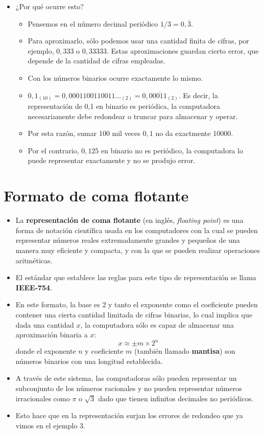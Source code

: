 \documentclass[openany]{book}
\providecommand{\tightlist}{%
  \setlength{\itemsep}{0pt}\setlength{\parskip}{0pt}}
\begin{document}
\begin{itemize}
\item
  ¿Por qué ocurre esto?

  \begin{itemize}
  \tightlist
  \item
    Pensemos en el número decimal periódico \(1/3 = 0,\overline3\).
  \item
    Para aproximarlo, sólo podemos usar una cantidad finita de cifras, por ejemplo, \(0,333\) o \(0,33333\). Estas aproximaciones guardan cierto error, que depende de la cantidad de cifras empleadas.
  \item
    Con los números binarios ocurre exactamente lo mismo.
  \item
    \(0,1_{(10)} = 0,0001100110011..._{(2)} = 0,0\overline{0011}_{(2)}\). Es decir, la representación de 0,1 en binario es periódica, la computadora necesariamente debe redondear o truncar para almacenar y operar.
  \item
    Por esta razón, sumar 100 mil veces \(0,1\) no da exactmente 10000.
  \item
    Por el contrario, \(0,125\) en binario no es periódico, la computadora lo puede representar exactamente y no se produjo error.
  \end{itemize}
\end{itemize}

\hypertarget{formato-de-coma-flotante}{%
\section{Formato de coma flotante}\label{formato-de-coma-flotante}}

\begin{itemize}
\item
  La \textbf{representación de coma flotante} (en inglés, \emph{floating point}) es una forma de notación científica usada en los computadores con la cual se pueden representar números reales extremadamente grandes y pequeños de una manera muy eficiente y compacta, y con la que se pueden realizar operaciones aritméticas.
\item
  El estándar que establece las reglas para este tipo de representación se llama \textbf{IEEE-754}.
\item
  En este formato, la base es 2 y tanto el exponente como el coeficiente pueden contener una cierta cantidad limitada de cifras binarias, lo cual implica que dada una cantidad \(x\), la computadora sólo es capaz de almacenar una aproximación binaria a \(x\):
  \[x \approx \pm m \times 2^n\]
  donde el exponente \(n\) y coeficiente \(m\) (también llamado \textbf{mantisa}) son números binarios con una longitud establecida.
\item
  A través de este sistema, las computadoras sólo pueden representar un subconjunto de los números racionales y no pueden representar números irracionales como \(\pi\) o \(\sqrt3\) dado que tienen infinitos decimales no periódicos.
\item
  Esto hace que en la representación surjan los errores de redondeo que ya vimos en el ejemplo 3.
\end{itemize}
\end{document}
